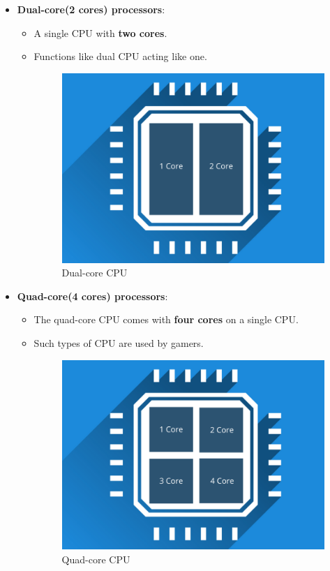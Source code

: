 \begin{flushleft}
\begin{itemize}
	\item \textbf{Dual-core(2 cores) processors}:
	\begin{itemize}
		\item A single CPU with \textbf{two cores}.
		\item Functions like dual CPU acting like one. 
		\begin{figure}[h!]
			\centering
			\includegraphics[scale=.3]{content/chapter12/images/dual.png}
			\caption{Dual-core CPU}
			\label{fig:single-core2}
		\end{figure}
	\end{itemize}
	\newpage
	\item \textbf{Quad-core(4 cores) processors}:
	\begin{itemize}
		\item The quad-core CPU comes with \textbf{four cores} on a single CPU. 
		\item Such types of CPU are used by gamers.
		\begin{figure}[h!]
			\centering
			\includegraphics[scale=.3]{content/chapter12/images/quad.png}
			\caption{Quad-core CPU}
			\label{fig:single-core3}
		\end{figure}
	\end{itemize}			
	

\end{itemize}
\end{flushleft}
